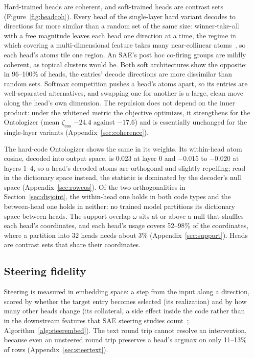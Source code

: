Hard-trained heads are coherent, and soft-trained heads are contrast sets
(Figure~\ref{fig:headcoh}).
Every head of the single-layer hard variant decodes to directions far more
similar than a random set of the same size: winner-take-all with a free
magnitude leaves each head one direction at a time, the regime in which
covering a multi-dimensional feature takes many near-collinear
atoms~\cite{dalili2026}, so each head's atoms tile one region. An SAE's post hoc
co-firing groups are mildly coherent, as topical clusters would be. Both
soft architectures show the opposite: in 96--100\% of heads, the entries'
decode directions are more dissimilar than random sets. Softmax
competition pushes a head's atoms apart, so its entries are
well-separated alternatives, and swapping one for another is a large,
clean move along the head's own dimension. The repulsion does not depend
on the inner product: under the whitened metric the objective optimizes,
it strengthens for the Ontologizer (mean $\zeta_{\cos}$ $-24.4$ against
$-17.6$) and is essentially unchanged for the single-layer variants
(Appendix~\ref{sec:coherence}).

The hard-code Ontologizer shows the same in its weights. Its within-head
atom cosine, decoded into output space, is 0.023 at layer 0 and $-0.015$
to $-0.020$ at layers 1--4, so a head's decoded atoms are orthogonal and
slightly repelling; read in the dictionary space instead, the statistic is
dominated by the decoder's null space (Appendix~\ref{sec:rowcos}). Of the
two orthogonalities in Section~\ref{sec:disjoint}, the within-head one
holds in both code types and the between-head one holds in neither: no
trained model partitions its dictionary space between heads. The support
overlap $\omega$ sits at or above a null that shuffles each head's
coordinates, and each head's usage covers 52--98\% of the coordinates,
where a partition into 32 heads needs about 3\%
(Appendix~\ref{sec:support}). Heads are contrast sets that share their
coordinates.

\subsection{Steering fidelity}
\label{sec:steer}

Steering is measured in embedding space: a step from the input along a
direction, scored by whether the target entry becomes selected (its
realization) and by how many other heads change (its collateral, a side
effect inside the code rather than in the downstream features that SAE
steering studies count~\cite{duan2026}; Algorithm~\ref{alg:steerembed}).
The text round trip cannot resolve an
intervention, because even an unsteered round trip preserves a head's
argmax on only 11--13\% of rows (Appendix~\ref{sec:steertext}).

